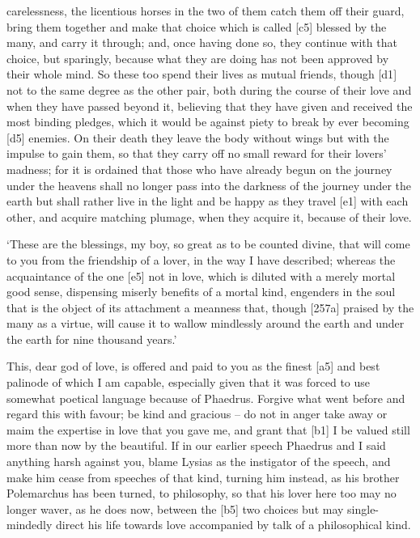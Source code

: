 carelessness, the licentious horses in the two of them catch them off
their guard, bring them together and make that choice which is called
{[}c5{]} blessed by the many, and carry it through; and, once having
done so, they continue with that choice, but sparingly, because what
they are doing has not been approved by their whole mind. So these too
spend their lives as mutual friends, though {[}d1{]} not to the same
degree as the other pair, both during the course of their love and when
they have passed beyond it, believing that they have given and received
the most binding pledges, which it would be against piety to break by
ever becoming {[}d5{]} enemies. On their death they leave the body
without wings but with the impulse to gain them, so that they carry off
no small reward for their lovers' madness; for it is ordained that those
who have already begun on the journey under the heavens shall no longer
pass into the darkness of the journey under the earth but shall rather
live in the light and be happy as they travel {[}e1{]} with each other,
and acquire matching plumage, when they acquire it, because of their
love.

‘These are the blessings, my boy, so great as to be counted divine, that
will come to you from the friendship of a lover, in the way I have
described; whereas the acquaintance of the one {[}e5{]} not in love,
which is diluted with a merely mortal good sense, dispensing miserly
benefits of a mortal kind, engenders in the soul that is the object of
its attachment a meanness that, though {[}257a{]} praised by the many as
a virtue, will cause it to wallow mindlessly around the earth and under
the earth for nine thousand years.'

This, dear god of love, is offered and paid to you as the finest
{[}a5{]} and best palinode of which I am capable, especially given that
it was forced to use somewhat poetical language because of
Phaedrus. Forgive what
went before and regard this with favour; be kind and gracious -- do not
in anger take away or maim the expertise in love that you gave
me, and grant that
{[}b1{]} I be valued still more than now by the beautiful. If in our
earlier speech Phaedrus and I said anything harsh against you, blame
Lysias as the instigator of the speech, and make him cease from speeches
of that kind, turning him instead, as his brother
Polemarchus has been
turned, to philosophy, so that his lover here too may no longer waver,
as he does now, between the {[}b5{]} two choices but may single-mindedly
direct his life towards love accompanied by
talk of a philosophical
kind.

